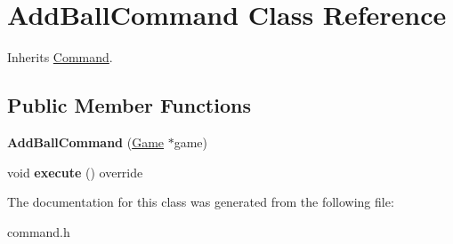 \hypertarget{class_add_ball_command}{}\section{Add\+Ball\+Command Class Reference}
\label{class_add_ball_command}


Inherits \mbox{\hyperlink{class_command}{Command}}.

\subsection*{Public Member Functions}
\begin{DoxyCompactItemize}
\item 
\mbox{\label{class_add_ball_command_a78c3af06496714915f34fe977a56dda3}} 
{\bfseries Add\+Ball\+Command} (\mbox{\hyperlink{class_game}{Game}} $\ast$game)
\item 
\mbox{\label{class_add_ball_command_ad64ca73dc757c9ee02122eb43f08ccf9}} 
void {\bfseries execute} () override
\end{DoxyCompactItemize}


The documentation for this class was generated from the following file\+:\begin{DoxyCompactItemize}
\item 
command.\+h\end{DoxyCompactItemize}
